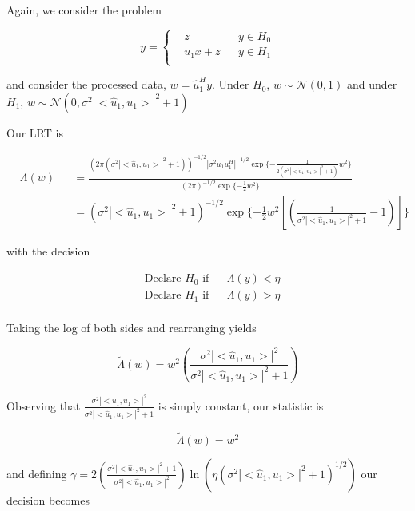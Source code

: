 \documentclass[english]{article}
\begin{document}
Again, we consider the problem

\begin{equation}
y=\left\{
\begin{aligned}
&z
&& y\in H_0\\
&u_1x+z
&& y\in H_1\\
\end{aligned}\right.
\end{equation}

and consider the processed data, $w=\hat{u}_1^Hy$. Under $H_0$, $w\sim\mathcal{N}(0,1)$ and under $H_1$, $w\sim\mathcal{N}(0, \sigma^2|<\hat{u}_1,u_1>|^2+1)$

Our LRT is

\begin{equation}
\begin{aligned}
&\Lambda(w)
&&=\frac{\left(2\pi(\sigma^2|<\hat{u}_1,u_1>|^2+1)\right)^{-1/2}|\sigma^2u_1u_1^H|^{-1/2}\exp\{-\frac{1}{2(\sigma^2|<\hat{u}_1,u_1>|^2+1)}w^2\}}{\left(2\pi\right)^{-1/2}\exp\{-\frac{1}{2}w^2\}}\\
&&&=(\sigma^2|<\hat{u}_1,u_1>|^2+1)^{-1/2}\exp\{-\frac{1}{2}w^2\left[\left(\frac{1}{\sigma^2|<\hat{u}_1,u_1>|^2+1}-1\right)\right]\}
\end{aligned}
\end{equation}

with the decision

\begin{equation}
\begin{aligned}
&\text{Declare } H_0 \text{ if}
&& \Lambda(y) < \eta\\
& \text{Declare } H_1 \text{ if}
&& \Lambda(y) > \eta\\
\end{aligned}
\end{equation}

Taking the log of both sides and rearranging yields

\begin{equation}
\tilde{\Lambda}(w) = w^2\left(\frac{\sigma^2|<\hat{u}_1,u_1>|^2}{\sigma^2|<\hat{u}_1,u_1>|^2+1}\right)
\end{equation}

Observing that $\frac{\sigma^2|<\hat{u}_1,u_1>|^2}{\sigma^2|<\hat{u}_1,u_1>|^2+1}$ is simply constant, our statistic is

\begin{equation}\label{eq:proc oracle}
\boxed{\tilde{\Lambda}(w) = w^2}
\end{equation}

and defining $\gamma = 2\left(\frac{\sigma^2|<\hat{u}_1,u_1>|^2+1}{\sigma^2|<\hat{u}_1,u_1>|^2}\right)\ln\left(\eta\left(\sigma^2|<\hat{u}_1,u_1>|^2+1\right)^{1/2}\right)$ our decision becomes
\end{document}
